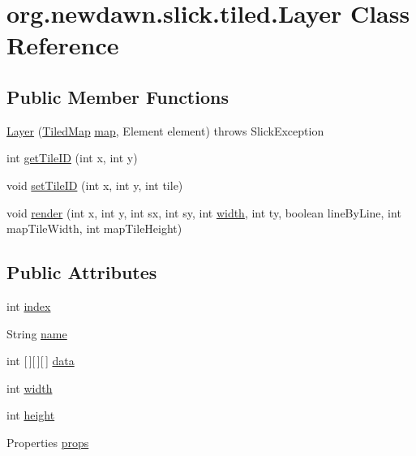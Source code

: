 \hypertarget{classorg_1_1newdawn_1_1slick_1_1tiled_1_1_layer}{}\section{org.\+newdawn.\+slick.\+tiled.\+Layer Class Reference}
\label{classorg_1_1newdawn_1_1slick_1_1tiled_1_1_layer}
\subsection*{Public Member Functions}
\begin{DoxyCompactItemize}
\item 
\mbox{\hyperlink{classorg_1_1newdawn_1_1slick_1_1tiled_1_1_layer_ad70b6189c60a0f7d1ca336d7febff1a0}{Layer}} (\mbox{\hyperlink{classorg_1_1newdawn_1_1slick_1_1tiled_1_1_tiled_map}{Tiled\+Map}} \mbox{\hyperlink{classorg_1_1newdawn_1_1slick_1_1tiled_1_1_layer_ad6494d6da75ffb77cacdec8d38d74982}{map}}, Element element)  throws Slick\+Exception 
\item 
int \mbox{\hyperlink{classorg_1_1newdawn_1_1slick_1_1tiled_1_1_layer_a3930aabf5f88cef45dad40439dc44f19}{get\+Tile\+ID}} (int x, int y)
\item 
void \mbox{\hyperlink{classorg_1_1newdawn_1_1slick_1_1tiled_1_1_layer_a8529c961c803882ae6be3ba7b49b995a}{set\+Tile\+ID}} (int x, int y, int tile)
\item 
void \mbox{\hyperlink{classorg_1_1newdawn_1_1slick_1_1tiled_1_1_layer_a25e1b0f9ec38e79ca80defa8b05f9218}{render}} (int x, int y, int sx, int sy, int \mbox{\hyperlink{classorg_1_1newdawn_1_1slick_1_1tiled_1_1_layer_a901731d81cc624050ffefd1af9d09119}{width}}, int ty, boolean line\+By\+Line, int map\+Tile\+Width, int map\+Tile\+Height)
\end{DoxyCompactItemize}
\subsection*{Public Attributes}
\begin{DoxyCompactItemize}
\item 
int \mbox{\hyperlink{classorg_1_1newdawn_1_1slick_1_1tiled_1_1_layer_ab1bb4ba1300c8e2d08bdbcefa14ab60e}{index}}
\item 
String \mbox{\hyperlink{classorg_1_1newdawn_1_1slick_1_1tiled_1_1_layer_a0792a70cf99a57c1a2a3042ead9b7873}{name}}
\item 
int \mbox{[}$\,$\mbox{]}\mbox{[}$\,$\mbox{]}\mbox{[}$\,$\mbox{]} \mbox{\hyperlink{classorg_1_1newdawn_1_1slick_1_1tiled_1_1_layer_a9370f031c215f22f2b18135d8ca5cbc8}{data}}
\item 
int \mbox{\hyperlink{classorg_1_1newdawn_1_1slick_1_1tiled_1_1_layer_a901731d81cc624050ffefd1af9d09119}{width}}
\item 
int \mbox{\hyperlink{classorg_1_1newdawn_1_1slick_1_1tiled_1_1_layer_acf0299abe971ba325493fd8031db08be}{height}}
\item 
Properties \mbox{\hyperlink{classorg_1_1newdawn_1_1slick_1_1tiled_1_1_layer_a457f0627d1e59eb8fdcd273f958d5759}{props}}
\end{DoxyCompactItemize}
